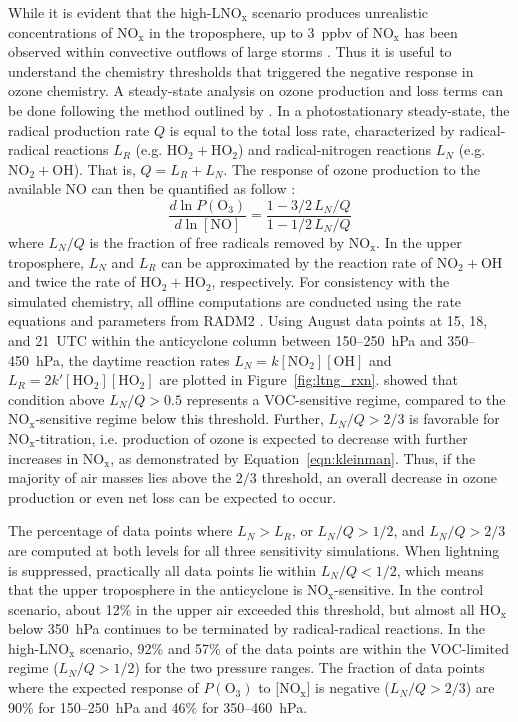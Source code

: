 While it is evident that the high-LNO$_\mathrm{x}$ scenario produces unrealistic
concentrations of NO$_\mathrm{x}$ in the troposphere, up to 3~ppbv of
NO$_\mathrm{x}$ has been observed within convective outflows of large
storms \citep[e.g.][]{Ott:2007hs,Cummings:2013vn}. Thus it is useful to understand the
chemistry thresholds that triggered the negative response in ozone chemistry.
A steady-state analysis on ozone production and loss terms can be done
following the method outlined by \citet{Kleinman:1997vn}. In a photostationary steady-state, the radical
production rate $Q$ is equal to the total loss rate, characterized by radical-radical
reactions $L_R$ (e.g. $\mathrm{HO_2+HO_2}$) and radical-nitrogen reactions
$L_N$ (e.g. $\mathrm{NO_2+OH}$). That is, $Q=L_R+L_N$. The response of
ozone production to the available NO can then be quantified as follow
\citep{Kleinman:1997vn}:
\begin{equation}\label{eqn:kleinman}
\frac{d\ln P(\mathrm{O_3})}{d\ln[\mathrm{NO}]} =
\frac{1-3/2\,L_N/Q}{1-1/2\,L_N/Q}
\end{equation}
where $L_N/Q$ is the fraction of free radicals removed by NO$_\mathrm{x}$.
In the upper troposphere, $L_N$ and $L_R$ can be approximated by the
reaction rate of $\mathrm{NO_2+OH}$ and twice the rate of
$\mathrm{HO_2+HO_2}$, respectively. For consistency with the simulated chemistry,
all offline computations are conducted using the rate equations and parameters from RADM2
\citep[][and references therein]{Stockwell:1990ez}. Using August data points
at 15, 18, and 21~UTC within the anticyclone column between 150--250~hPa
and 350--450~hPa, the daytime reaction rates $L_N=k\mathrm{[NO_2][OH]}$ and
$L_R=2k'\mathrm{[HO_2][HO_2]}$ are plotted in Figure~\ref{fig:ltng_rxn}.
\citet{Kleinman:2001fk} showed that condition above $L_N/Q>0.5$ represents
a VOC-sensitive regime, compared to the NO$_\mathrm{x}$-sensitive regime
below this threshold. Further, $L_N/Q>2/3$ is favorable for NO$_\mathrm{x}$-titration,
i.e. production of ozone is expected to decrease with further increases in
NO$_\mathrm{x}$, as demonstrated by Equation~\ref{eqn:kleinman}. Thus,
if the majority of air masses lies above the $2/3$ threshold, an overall decrease
in ozone production or even net loss can be expected to occur.

The percentage of data points where $L_N>L_R$, or $L_N/Q>1/2$, and
$L_N/Q>2/3$ are computed at both levels for all three sensitivity simulations. When
lightning is suppressed, practically all data points lie within $L_N/Q<1/2$,
which means that the upper troposphere in the anticyclone is NO$_\mathrm{x}$-sensitive.
In the control scenario, about 12\% in the upper air exceeded this
threshold, but almost all HO$_\mathrm{x}$ below 350~hPa continues to
be terminated by radical-radical reactions. In the high-LNO$_\mathrm{x}$
scenario, 92\% and 57\% of the data points are within the VOC-limited regime
($L_N/Q>1/2$) for the two pressure ranges. The fraction of data points
where the expected response of $P(\mathrm{O_3})$ to [NO$_\mathrm{x}$]
is negative ($L_N/Q>2/3$) are 90\% for 150--250~hPa and 46\% for
350--460~hPa.

